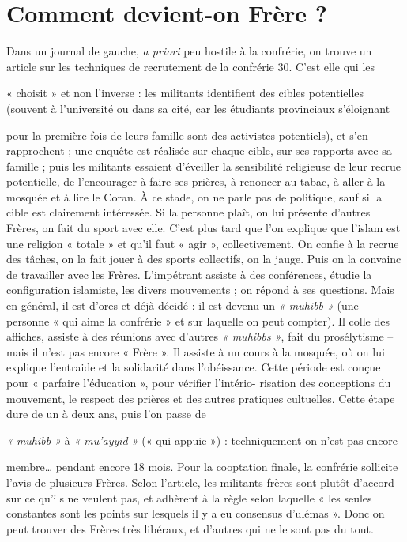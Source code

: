 \hypertarget{comment-devient-on-fruxe8re}{%
\section{Comment devient-on Frère ?}\label{comment-devient-on-fruxe8re}}

 
Dans un journal de gauche, \emph{a priori} peu hostile à la confrérie,
on trouve un article sur les techniques de recrutement de la confrérie
30. C'est elle qui les

« choisit » et non l'inverse : les militants identifient des cibles
potentielles (souvent à l'université ou dans sa cité, car les étudiants
provinciaux s'éloignant

pour la première fois de leurs famille sont des activistes potentiels),
et s'en rapprochent ; une enquête est réalisée sur chaque cible, sur ses
rapports avec sa famille ; puis les militants essaient d'éveiller la
sensibilité religieuse de leur recrue potentielle, de l'encourager à
faire ses prières, à renoncer au tabac, à aller à la mosquée et à lire
le Coran. À ce stade, on ne parle pas de politique, sauf si la cible est
clairement intéressée. Si la personne plaît, on lui présente d'autres
Frères, on fait du sport avec elle. C'est plus tard que l'on explique
que l'islam est une religion « totale » et qu'il faut « agir »,
collectivement. On confie à la recrue des tâches, on la fait jouer à des
sports collectifs, on la jauge. Puis on la convainc de travailler avec
les Frères. L'impétrant assiste à des conférences, étudie la
configuration islamiste, les divers mouvements ; on répond à ses
questions. Mais en général, il est d'ores et déjà décidé : il est devenu
un \emph{« muhibb »} (une personne « qui aime la confrérie » et sur
laquelle on peut compter). Il colle des affiches, assiste à des réunions
avec d'autres \emph{« muhibbs »}, fait du prosélytisme -- mais il n'est
pas encore « Frère ». Il assiste à un cours à la mosquée, où on lui
explique l'entraide et la solidarité dans l'obéissance. Cette période
est conçue pour « parfaire l'éducation », pour vérifier l'intério-
risation des conceptions du mouvement, le respect des prières et des
autres pratiques cultuelles. Cette étape dure de un à deux ans, puis
l'on passe de

\emph{« muhibb »} à \emph{« mu'ayyid »} (« qui appuie ») : techniquement
on n'est pas encore

membre\ldots{} pendant encore 18 mois. Pour la cooptation finale, la
confrérie sollicite l'avis de plusieurs Frères. Selon l'article, les
militants frères sont plutôt d'accord sur ce qu'ils ne veulent pas, et
adhèrent à la règle selon laquelle « les seules constantes sont les
points sur lesquels il y a eu consensus d'ulémas ». Donc on peut trouver
des Frères très libéraux, et d'autres qui ne le sont pas du tout.

